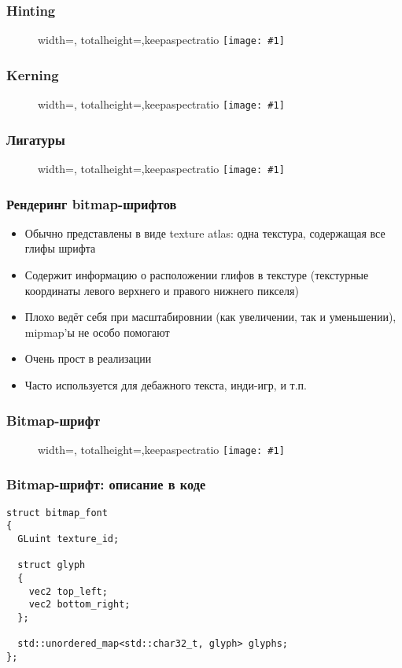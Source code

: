 \documentclass{beamer}
\newcommand{\slideimage}[1]{
  \begin{figure}
    \begin{adjustbox}{width=\textwidth, totalheight=\textheight-2\baselineskip-2\baselineskip,keepaspectratio}
      \texttt{[image: \#1]}
    \end{adjustbox}
  \end{figure}
}
\begin{document}
\begin{frame}[fragile]
\frametitle{Hinting}
\slideimage{hinting.png}
\end{frame}

\begin{frame}[fragile]
\frametitle{Kerning}
\slideimage{kerning.png}
\end{frame}

\begin{frame}[fragile]
\frametitle{Лигатуры}
\slideimage{ligatures.png}
\end{frame}

\begin{frame}[fragile]
\frametitle{Рендеринг bitmap-шрифтов}
\begin{itemize}
\item Обычно представлены в виде texture atlas: одна текстура, содержащая все глифы шрифта
\pause
\item Содержит информацию о расположении глифов в текстуре (текстурные координаты левого верхнего и правого нижнего пикселя)
\pause
\item Плохо ведёт себя при масштабировнии (как увеличении, так и уменьшении), mipmap'ы не особо помогают
\pause
\item Очень прост в реализации
\pause
\item Часто используется для дебажного текста, инди-игр, и т.п.
\end{itemize}
\end{frame}

\begin{frame}[fragile]
\frametitle{Bitmap-шрифт}
\slideimage{bitmap-font.png}
\end{frame}

\begin{frame}[fragile]
\frametitle{Bitmap-шрифт: описание в коде}
\begin{verbatim}
struct bitmap_font
{
  GLuint texture_id;

  struct glyph
  {
    vec2 top_left;
    vec2 bottom_right;
  };

  std::unordered_map<std::char32_t, glyph> glyphs;
};
\end{verbatim}
\end{frame}
\end{document}
